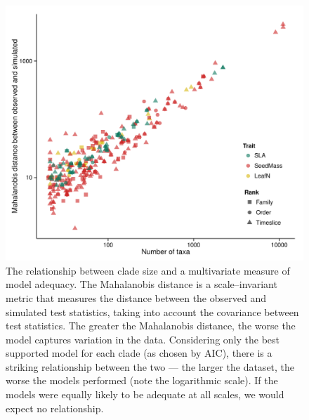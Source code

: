\documentclass[a4paper,11pt]{article}
\begin{document}
\begin{figure}[p]
  \centering
  \includegraphics[scale=0.8]{figs/ad-size-ml}
  \caption{The relationship between clade size and a multivariate measure of model adequacy. The Mahalanobis distance is a scale--invariant metric that measures the distance between the observed and simulated test statistics, taking into account the covariance between test statistics. The greater the Mahalanobis distance, the worse the model captures variation in the data. Considering only the best supported model for each clade (as chosen by AIC), there is a striking relationship between the two --- the larger the dataset, the worse the models performed (note the logarithmic scale). If the models were equally likely to be adequate at all scales, we would expect no relationship.}
  \label{fig:size-adequacy}
\end{figure}


\renewcommand\thefigure{S\arabic{figure}}
\renewcommand\thetable{S \arabic{table}}
\setcounter{figure}{0}    
\setcounter{table}{0}
\end{document}
